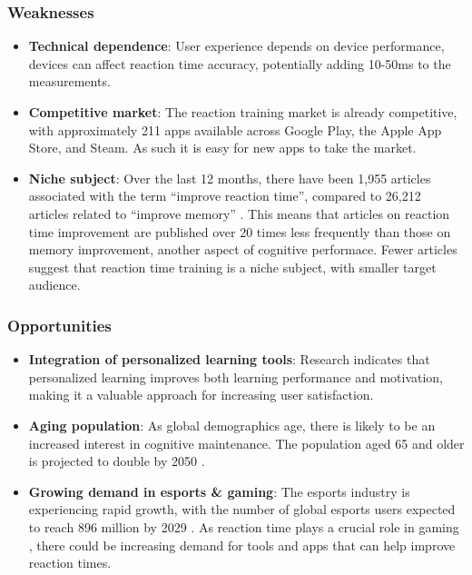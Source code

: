 \documentclass[]{VUMIFTemplateClass}
\begin{document}
\subsubsection{Weaknesses}
\begin{itemize}
    \item \textbf{Technical dependence}: User experience depends on device performance, devices can affect reaction time accuracy, potentially adding 10-50ms to the measurements\cite{humanbenchmark}.
    \item \textbf{Competitive market}: The reaction training market is already competitive, with approximately 211 apps available across Google Play, the Apple App Store, and Steam. As such it is easy for new apps to take the market.
    \item \textbf{Niche subject}: Over the last 12 months, there have been 1,955 articles associated with the term “improve reaction time”, compared to 26,212 articles related to “improve memory” \cite{muckruck}. This means that articles on reaction time improvement are published over 20 times less frequently than those on memory improvement, another aspect of cognitive performace. Fewer articles suggest that reaction time training is a niche subject, with smaller target audience.
\end{itemize}
\subsubsection{Opportunities}
\begin{itemize}
    \item \textbf{Integration of personalized learning tools}: Research indicates that personalized learning improves both learning performance and motivation, making it a valuable approach for increasing user satisfaction\cite{PersonalizedLearning}.
    \item \textbf{Aging population}: As global demographics age, there is likely to be an increased interest in cognitive maintenance. The population aged 65 and older is projected to double by 2050 \cite{PopulationDemographics}.
    \item \textbf{Growing demand in esports \& gaming}: The esports industry is experiencing rapid growth, with the number of global esports users expected to reach 896 million by 2029 \cite{statista}. As reaction time plays a crucial role in gaming \cite{VideoGamesReaction}, there could be increasing demand for tools and apps that can help improve reaction times.

\end{itemize}
\end{document}
